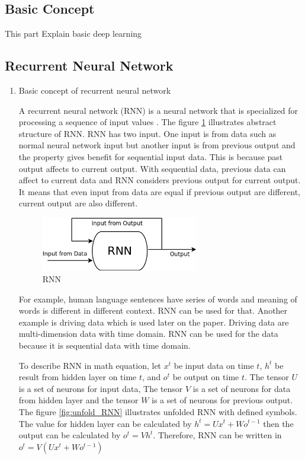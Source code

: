 \documentclass[draft,dvipsnames]{drexel-thesis}
\begin{document}
\begin{thesis}
\subsection{Basic Concept}\label{subsec:basicDL}
This part Explain basic deep learning

\subsection{Recurrent Neural Network}\label{subsec:RNN}

\begin{enumerate}
\item Basic concept of recurrent neural network

	A recurrent neural network (RNN) is a neural network that is specialized for processing a sequence of input values \cite{Goodfellow-et-al-2016}. The figure \ref{fig:RNN} illustrates abstract structure of RNN. RNN has two input. One input is from data such as normal neural network input but another input is from previous output and the property gives benefit for sequential input data. This is because past output affects to current output. With sequential data, previous data can affect to current data and RNN considers previous output for current output. It means that even input from data are equal if previous output are different, current output are also different.
	
\begin{figure}[t!]
    \centering
    \includegraphics[width=0.65\textwidth]{pictures/figures/RNN.png}
    \caption{RNN}
    \label{fig:RNN}
\end{figure}
	
	For example, human language sentences have series of words and meaning of words is different in different context. RNN can be used for that. Another example is driving data which is used later on the paper.  Driving data are multi-dimension data with time domain. RNN can be used for the data because it is sequential data with time domain.
	
	To describe RNN in math equation, let $x^{t}$ be input data on time $t$, $h^{t}$ be result from hidden layer on time $t$, and $o^{t}$ be output on time $t$. The tensor $U$ is a set of neurons for input data, The tensor $V$ is a set of neurons for data from hidden layer and the tensor $W$ is a set of neurons for previous output. The figure \ref{fig:unfold_RNN} illustrates unfolded RNN with defined symbols. The value for hidden layer can be calculated by $h^{t} = Ux^{t} + Wo^{t-1}$ then the output can be calculated by $o^{t} = Vh^{t}$. Therefore, RNN can be written in $o^{t} = V(Ux^{t} + Wo^{t-1})$
	

\end{enumerate}
\end{thesis}
\end{document}
